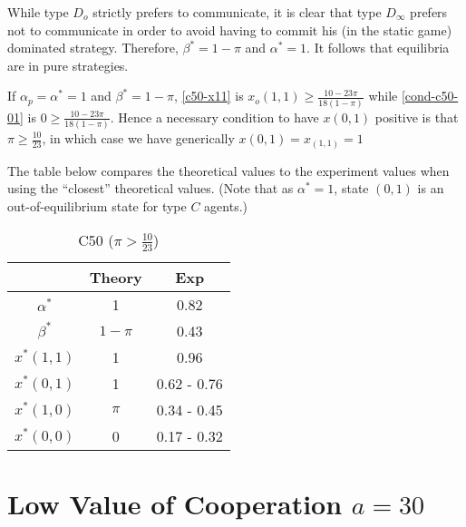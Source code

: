 \documentclass[12pt]{article}
\begin{document}
While type $D_o$ strictly prefers to communicate, it is clear that type $D_\infty$ prefers not to communicate in order to avoid having to commit his (in the static game) dominated strategy. Therefore, $\beta^* = 1-\pi$ and $\alpha^*=1$. It follows that equilibria are in pure strategies.

If $\alpha_p=\alpha^*=1$ and $\beta^*=1-\pi$, \eqref{c50-x11} is $x_o(1,1)\geq \frac{10-23\pi}{18(1-\pi)}$ while \eqref{cond-c50-01} is $0\geq \frac{10-23\pi}{18(1-\pi)}$. Hence a necessary condition to have $x(0,1)$ positive is that $\pi\geq \frac{10}{23}$, in which case we have generically $x(0,1)=x_(1,1)=1$

The table below compares the theoretical values to the experiment values when using the ``closest'' theoretical values. (Note that as $\alpha^*=1$, state $(0,1)$ is an out-of-equilibrium state for type $C$ agents.)
%
\begin{table}[h!]
		\centering
		\begin{tabular}{c c c}
		& Theory 	& Exp \\
		\hline
		$\alpha^*$ 	& 1	& 0.82\\
		$\beta^*$ 	& $1-\pi$ & 0.43\\ 
		\hline
		$x^*(1,1)$ 	& 1	& 0.96\\ 
		$x^*(0,1)$ & 1 & 0.62 - 0.76\\ 
		$x^*(1,0)$ & $\pi$ & 0.34 - 0.45\\
		$x^*(0,0)$ & 0 &  0.17 - 0.32\\
			\hline
\end{tabular}
\caption{C50 ($\pi>\frac{10}{23}$)}
\label{fig:C50}
\end{table}
%
%   
%    
\section{Low Value of Cooperation $a=30$}

%
\end{document}
